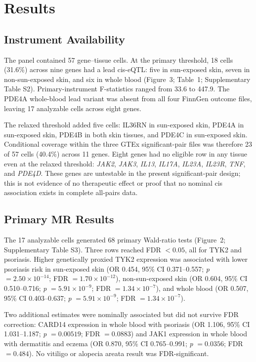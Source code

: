 \section*{Results}

\subsection*{Instrument Availability}

The panel contained 57 gene--tissue cells. At the primary threshold, 18 cells (31.6\%) across nine genes had a lead cis-eQTL: five in sun-exposed skin, seven in non-sun-exposed skin, and six in whole blood (Figure~3; Table~1; Supplementary Table S2). Primary-instrument F-statistics ranged from 33.6 to 447.9. The PDE4A whole-blood lead variant was absent from all four FinnGen outcome files, leaving 17 analyzable cells across eight genes.

The relaxed threshold added five cells: IL36RN in sun-exposed skin, PDE4A in sun-exposed skin, PDE4B in both skin tissues, and PDE4C in sun-exposed skin. Conditional coverage within the three GTEx significant-pair files was therefore 23 of 57 cells (40.4\%) across 11 genes. Eight genes had no eligible row in any tissue even at the relaxed threshold: \textit{JAK2}, \textit{JAK3}, \textit{IL13}, \textit{IL17A}, \textit{IL23A}, \textit{IL23R}, \textit{TNF}, and \textit{PDE4D}. These genes are untestable in the present significant-pair design; this is not evidence of no therapeutic effect or proof that no nominal cis association exists in complete all-pairs data.

\subsection*{Primary MR Results}

The 17 analyzable cells generated 68 primary Wald-ratio tests (Figure~2; Supplementary Table S3). Three rows reached FDR $<0.05$, all for TYK2 and psoriasis. Higher genetically proxied TYK2 expression was associated with lower psoriasis risk in sun-exposed skin (OR 0.454, 95\% CI 0.371--0.557; \textit{p} $=2.50\times10^{-14}$; FDR $=1.70\times10^{-12}$), non-sun-exposed skin (OR 0.604, 95\% CI 0.510--0.716; \textit{p} $=5.91\times10^{-9}$; FDR $=1.34\times10^{-7}$), and whole blood (OR 0.507, 95\% CI 0.403--0.637; \textit{p} $=5.91\times10^{-9}$; FDR $=1.34\times10^{-7}$).

Two additional estimates were nominally associated but did not survive FDR correction: CARD14 expression in whole blood with psoriasis (OR 1.106, 95\% CI 1.031--1.187; \textit{p} $=0.00519$; FDR $=0.0883$) and JAK1 expression in whole blood with dermatitis and eczema (OR 0.870, 95\% CI 0.765--0.991; \textit{p} $=0.0356$; FDR $=0.484$). No vitiligo or alopecia areata result was FDR-significant.

